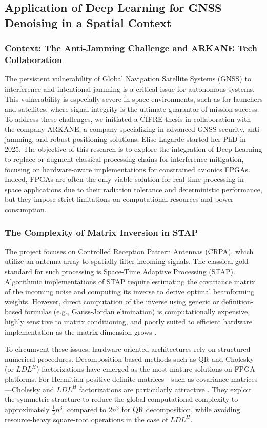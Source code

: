 \documentclass[11pt]{report}
\begin{document}
\subsection{Application of Deep Learning for GNSS Denoising in a Spatial Context}

\subsubsection{Context: The Anti-Jamming Challenge and ARKANE Tech Collaboration}
The persistent vulnerability of Global Navigation Satellite Systems (GNSS) to interference and intentional jamming is a critical issue for autonomous systems. This vulnerability is especially severe in space environments, such as for launchers and satellites, where signal integrity is the ultimate guarantor of mission success. To address these challenges, we initiated a CIFRE thesis in collaboration with the company ARKANE, a company specializing in advanced GNSS security, anti-jamming, and robust positioning solutions. Elise Lagarde started her PhD in 2025. The objective of this research is to explore the integration of Deep Learning to replace or augment classical processing chains for interference mitigation, focusing on hardware-aware implementations for constrained avionics FPGAs. Indeed, FPGAs are often the only viable solution for real-time processing in space applications due to their radiation tolerance and deterministic performance, but they impose strict limitations on computational resources and power consumption.

\subsubsection{The Complexity of Matrix Inversion in STAP}
The project focuses on Controlled Reception Pattern Antennas (CRPA), which utilize an antenna array to spatially filter incoming signals. The classical gold standard for such processing is Space-Time Adaptive Processing (STAP). Algorithmic implementations of STAP require estimating the covariance matrix of the incoming noise and computing its inverse to derive optimal beamforming weights. However, direct computation of the inverse using generic or definition-based formulas (e.g., Gauss-Jordan elimination) is computationally expensive, highly sensitive to matrix conditioning, and poorly suited to efficient hardware implementation as the matrix dimension grows \cite{moussa2013gaussjordan_fpga}.

To circumvent these issues, hardware-oriented architectures rely on structured numerical procedures. Decomposition-based methods such as QR \cite{desai2017qr_fpga, Karkooti2005QRDRLS} and Cholesky (or $LDL^H$) \cite{luo2013cholesky_fpga, yang2012cholesky_fpga} factorizations have emerged as the most mature solutions on FPGA platforms. For Hermitian positive-definite matrices—such as covariance matrices—Cholesky and $LDL^H$ factorizations are particularly attractive \cite{li2022matrix}. They exploit the symmetric structure to reduce the global computational complexity to approximately $\frac{1}{3}n^3$, compared to $2n^3$ for QR decomposition, while avoiding resource-heavy square-root operations in the case of $LDL^H$.
\end{document}

